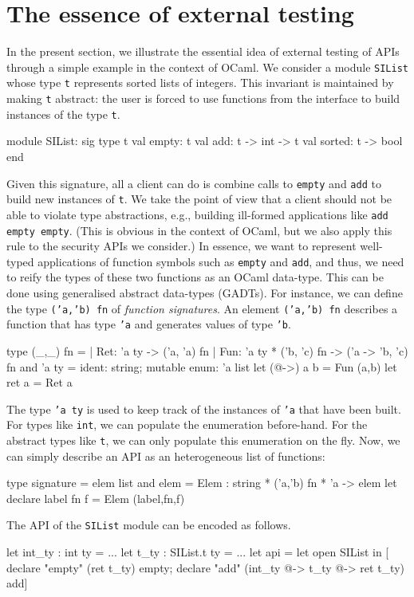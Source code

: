 \documentclass[twocolumn,9pt]{article}
\newcommand{\code}[1]{\texttt{#1}}
\begin{document}
\section{The essence of external testing}\label{sec:example}
In the present section, we illustrate the essential idea of external
testing of APIs through a simple example in the context of OCaml. We
consider a module \code{SIList} whose type \code{t} represents sorted
lists of integers. This invariant is maintained by making \code{t}
abstract: the user is forced to use functions from the interface to
build instances of the type \code{t}.
\begin{ocamlcode}
module SIList: sig
  type t
  val empty: t
  val add: t -> int -> t
  val sorted: t -> bool
end
\end{ocamlcode}
Given this signature, all a client can do is combine calls to
\code{empty} and \code{add} to build new instances of \code{t}. We
take the point of view that a client should not be able to violate
type abstractions, e.g., building ill-formed applications like
\code{add empty empty}. (This is obvious in the context of OCaml, but
we also apply this rule to the security APIs we consider.)
%
In essence, we want to represent well-typed applications of function
symbols such as \code{empty} and \code{add}, and thus, we need to
reify the types of these two functions as an OCaml data-type. This can
be done using generalised abstract data-types (GADTs). For instance,
we can define the type \code{('a,'b) fn} of \emph{function
  signatures}.  An element \code{('a,'b) fn} describes a function that
has type \code{'a} and generates values of type \code{'b}.
\begin{ocamlcode}
type (_,_) fn =
| Ret: 'a ty -> ('a, 'a) fn
| Fun: 'a ty *  ('b, 'c) fn -> ('a -> 'b, 'c) fn
and 'a ty = {ident: string; mutable enum: 'a list}
let (@->) a b = Fun (a,b)
let ret a = Ret a
\end{ocamlcode}
The type \code{'a ty} is used to keep track of the instances of
\code{'a} that have been built. For types like \code{int}, we can
populate the enumeration before-hand. For the abstract types like
\code{t}, we can only populate this enumeration on the fly. Now, we
can simply describe an API as an heterogeneous list of functions:
\begin{ocamlcode}
type signature = elem list
and  elem = Elem : string * ('a,'b) fn * 'a -> elem
let declare label fn f = Elem (label,fn,f)
\end{ocamlcode}
The API of the \code{SIList} module can be encoded as follows.
\begin{ocamlcode}
let int_ty : int ty = ...
let t_ty : SIList.t ty = ...
let api =
  let open SIList in
  [ declare "empty" (ret t_ty) empty;
    declare "add" (int_ty @-> t_ty @-> ret t_ty) add]
\end{ocamlcode}
\end{document}
